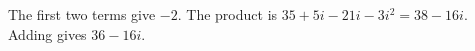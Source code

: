 The first two terms give $-2$. The product is $35+5i-21i-3i^2=38-16i$. Adding gives $\boxed{36-16i}$.
